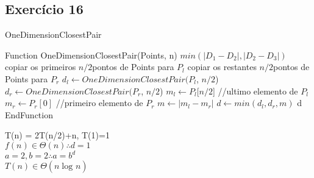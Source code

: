 \newpage
\subsection{Exercício 16}\label{sec:exer16}

\begin{algorithm}
  \caption{OneDimensionClosestPair}
  \begin{algorithmic}
    \STATE Function OneDimensionClosestPair(Points, n)
        \RETURN $min(|D_1 - D_2|, |D_2 - D_3|)$
      \ELSE
        \STATE copiar os primeiros \big\lceil$n/2$\big\rceil pontos de Points para $P_l$
        \STATE copiar os restantes \big\lfloor$n/2$\big\rfloor pontos de Points para $P_r$
        \STATE $d_l \leftarrow OneDimensionClosestPair(P_l$, \big\lceil$n/2$\big\rceil)
        \STATE $d_r \leftarrow OneDimensionClosestPair(P_r$, \big\lfloor$n/2$\big\rfloor)
        \STATE $m_l \leftarrow P_l$[\big\lceil$n/2$\big{}] {//ultimo elemento de $P_l$}
        \STATE $m_r \leftarrow P_r[0]$ {//primeiro elemento de $P_r$}
        \STATE $m \leftarrow |m_l - m_r|$
        \STATE $d \leftarrow min(d_l, d_r, m)$
        \RETURN d
      \ENDIF
    \STATE EndFunction
  \end{algorithmic}
\end{algorithm}

T(n) = 2T(n/2)+n, T(1)=1 \\
  $f(n) \in \Theta(n) \therefore d=1$ \\
  $a = 2, b = 2 \therefore a=b^{d}$ \\
  $T(n) \in \Theta(n\log_{}n)$

